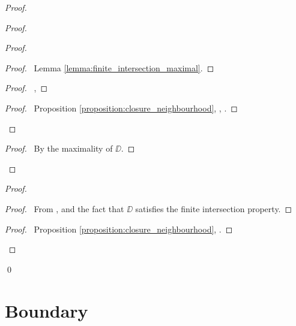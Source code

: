 \begin{proof}
    \pf
    \begin{proof}
        \begin{proof}
            \begin{proof}
                \pf\ Lemma \ref{lemma:finite_intersection_maximal}.
            \end{proof}
            \begin{proof}
                \pf\ , 
            \end{proof}
            \begin{proof}
                \pf\ Proposition \ref{proposition:closure_neighbourhood}, , .
            \end{proof}
        \end{proof}
        \begin{proof}
            \pf\ By the maximality of $\DD$.
        \end{proof}
    \end{proof}
    \begin{proof}
        \begin{proof}
            \pf\ From ,  and the fact that $\DD$ satisfies the finite intersection property.
        \end{proof}
        \begin{proof}
            \pf\ Proposition \ref{proposition:closure_neighbourhood}, .
        \end{proof}
    \end{proof}
    \qed
\end{proof}

\section{Boundary}

